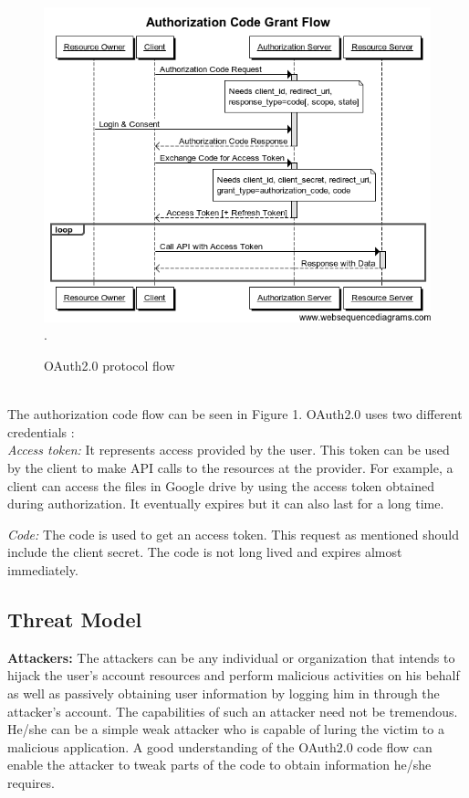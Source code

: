 \begin{enumerate}[label=(\Alph*)]
\begin{itemize}
\end{itemize}
	\begin{figure}[t]
    		\centering
   		 \includegraphics[width=\columnwidth]{figures/auth_code_flow.png}.
    		\caption{OAuth2.0 protocol flow}
    		\label{fig:flow}
	\end{figure} ~\\
The authorization code flow can be seen in Figure 1. 
OAuth2.0 uses two different credentials :\\
\textit{Access token:}
It represents access provided by the user. This token can be used by the client to make API calls to the resources at the provider. For example, a client can access the files in Google drive by using the access token obtained during authorization. It eventually expires but it can also last for a long time. 

\textit{Code:}
The code is used to get an access token. This request as mentioned should include the client secret. The code is not long lived and expires almost immediately. 
\end{enumerate}

\subsection{Threat Model}
\label{sec:threat}
\textbf{Attackers:} The attackers can be any individual or organization that intends to hijack the user's account resources and perform malicious activities on his behalf as well as passively obtaining user information by logging him in through the attacker's account. The capabilities of such an attacker need not be tremendous. He/she can be a simple weak attacker who is capable of luring the victim to a malicious application. A good understanding of the OAuth2.0 code flow can enable the attacker to tweak parts of the code to obtain information he/she requires. 

